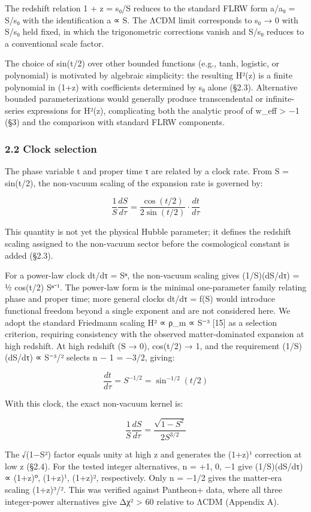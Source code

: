 The redshift relation 1 + z = s₀/S reduces to the standard FLRW form
a/a₀ = S/s₀ with the identification a ∝ S. The ΛCDM limit corresponds to
s₀ → 0 with S/s₀ held fixed, in which the trigonometric corrections
vanish and S/s₀ reduces to a conventional scale factor.

The choice of sin(t/2) over other bounded functions (e.g., tanh,
logistic, or polynomial) is motivated by algebraic simplicity: the
resulting H²(z) is a finite polynomial in (1+z) with coefficients
determined by s₀ alone (§2.3). Alternative bounded parameterizations
would generally produce transcendental or infinite-series expressions
for H²(z), complicating both the analytic proof of w\_eff \textgreater{}
−1 (§3) and the comparison with standard FLRW components.

\subsubsection{2.2 Clock selection}\label{clock-selection}

The phase variable t and proper time τ are related by a clock rate. From
S = sin(t/2), the non-vacuum scaling of the expansion rate is governed
by:

\[\frac{1}{S}\frac{dS}{d\tau} = \frac{\cos(t/2)}{2\sin(t/2)} \cdot \frac{dt}{d\tau}\]

This quantity is not yet the physical Hubble parameter; it defines the
redshift scaling assigned to the non-vacuum sector before the
cosmological constant is added (§2.3).

For a power-law clock dt/dτ = Sⁿ, the non-vacuum scaling gives
(1/S)(dS/dτ) = ½ cos(t/2) Sⁿ⁻¹. The power-law form is the minimal
one-parameter family relating phase and proper time; more general clocks
dt/dτ = f(S) would introduce functional freedom beyond a single exponent
and are not considered here. We adopt the standard Friedmann scaling H²
∝ ρ\_m ∝ S⁻³ {[}15{]} as a selection criterion, requiring consistency
with the observed matter-dominated expansion at high redshift. At high
redshift (S → 0), cos(t/2) → 1, and the requirement (1/S)(dS/dτ) ∝ S⁻³/²
selects n − 1 = −3/2, giving:

\[\frac{dt}{d\tau} = S^{-1/2} = \sin^{-1/2}(t/2)\]

With this clock, the exact non-vacuum kernel is:

\[\frac{1}{S}\frac{dS}{d\tau} = \frac{\sqrt{1 - S^2}}{2S^{3/2}}\]

The √(1−S²) factor equals unity at high z and generates the (1+z)¹
correction at low z (§2.4). For the tested integer alternatives, n = +1,
0, −1 give (1/S)(dS/dτ) ∝ (1+z)⁰, (1+z)¹, (1+z)², respectively. Only n =
−1/2 gives the matter-era scaling (1+z)³/². This was verified against
Pantheon+ data, where all three integer-power alternatives give Δχ²
\textgreater{} 60 relative to ΛCDM (Appendix A).

